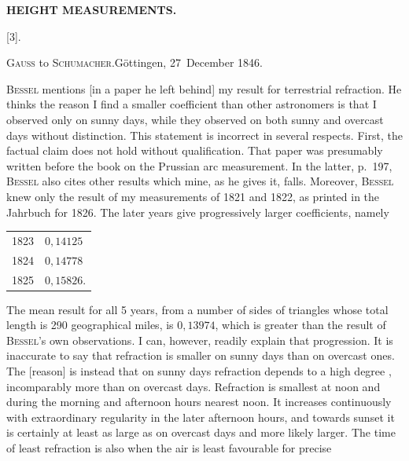 \par\clearpage
\noindent\null\hfill{\small\textbf{HEIGHT MEASUREMENTS.}}\hfill{}\par\medskip
\begin{center}
[3].\par{}\par\bigskip
\textsc{Gauss} to \textsc{Schumacher}.\quad Göttingen, 27~December 1846.
\end{center}
\par\noindent\hspace*{\parindent}\textsc{Bessel} mentions [in a paper he left behind] my result for terrestrial refraction.
He thinks the reason I find a smaller coefficient than other astronomers is that I
observed only on sunny days, while they observed on both sunny and overcast days
without distinction. This statement is incorrect in several respects. First, the
factual claim does not hold without qualification. That paper was presumably written
before the book on the Prussian arc measurement. In the latter, p.~197, \textsc{Bessel} also
cites other results  which mine, as he gives it, falls. Moreover,
\textsc{Bessel} knew only the result of my measurements of 1821 and 1822, as printed in the
Jahrbuch for 1826. The later years give progressively larger coefficients, namely
\begin{center}
\begin{tabular}{r@{\ .\ .\ .\ }l}
1823&\(0{,}14125\)\\
1824&\(0{,}14778\)\\
1825&\(0{,}15826\).
\end{tabular}
\end{center}
\par\noindent\hspace*{\parindent}The mean result for all 5 years, from a number of sides of triangles whose total
length is 290 geographical miles, is \(0{,}13974\), which is greater than the result of
\textsc{Bessel}'s own observations. I can, however, readily explain that progression.
It is inaccurate to say that refraction is smaller on sunny days than on overcast
ones. The [reason] is instead that on sunny days refraction depends to a high degree
, incomparably more than on overcast days. Refraction is
smallest at noon and during the morning and afternoon hours nearest noon. It increases
continuously with extraordinary regularity in the later afternoon hours, and towards
sunset it is certainly at least as large as on overcast days and more likely larger.
The time of least refraction is also when the air is least favourable for precise
\par\medskip\noindent\null\hfill\makebox[0.18\linewidth][l]{56\textsuperscript{*}}\par

